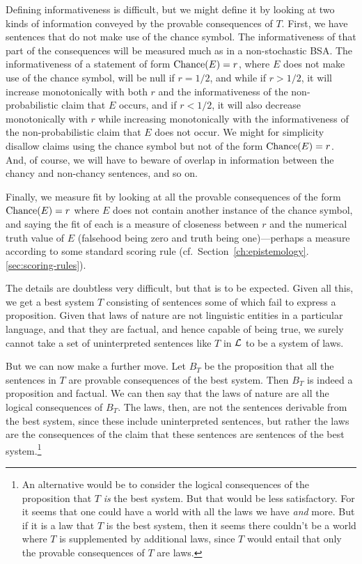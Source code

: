 Defining informativeness is difficult, but we might define it by looking at two kinds of information conveyed by the 
provable consequences of $T$. First, we have sentences that do not make use of the chance symbol. The informativeness
of that part of the consequences will be measured much as in a non-stochastic BSA. The informativeness of a statement
of form $\operatorname{Chance}(E)=r$, where $E$ does not make use of the chance symbol, will be null if $r=1/2$, and while if $r>1/2$, it will increase monotonically with both $r$ 
and the informativeness of the non-probabilistic claim that $E$ occurs, and if $r<1/2$, it will also decrease monotonically with $r$ while increasing monotonically with the informativeness of the non-probabilistic claim that $E$ does not occur. We might for
simplicity disallow claims using the chance symbol but not of the form $\operatorname{Chance}(E)=r$. And, of course, we
will have to beware of overlap in information between the chancy and non-chancy sentences, and so on. 

Finally, we measure fit by looking at all the provable consequences of the form $\operatorname{Chance}(E)=r$ where $E$ does not contain another
instance of the chance symbol, and saying the fit of each is a measure of closeness between $r$ and the numerical truth value of $E$ (falsehood
being zero and truth being one)---perhaps a measure according to some standard scoring rule (cf.\ Section~\ref{ch:epistemology}.\ref{sec:scoring-rules}).

The details are doubtless very difficult, but that is to be expected.
Given all this, we get a best system $T$ consisting of sentences some of which fail to express a proposition. Given that laws of nature
are not linguistic entities in a particular language, and that they are factual, and hence capable of being true, 
we surely cannot take  a set of uninterpreted sentences like $T$ in $\mathcal L$ to be a system of laws. 

But we can now make a further move.
Let $B_T$ be the proposition that all the sentences in $T$ are provable consequences of the best system. Then $B_T$ is indeed a proposition
and factual. We can then say that the laws of nature are all the logical consequences of $B_T$. The laws, then, are not the sentences derivable from the best system, 
since these include uninterpreted sentences, but rather the laws are the consequences of the claim that these sentences are sentences of the 
best system.\footnote{An alternative would be
to consider the logical consequences of the proposition that $T$ \textit{is} the best system. But that would be less satisfactory. For it
seems that one could have a world with all the laws we have \textit{and} more. But if it is a law that $T$ is the best system, then it seems
there couldn't be a world where $T$ is supplemented by additional laws, since $T$ would entail that only the 
provable consequences of $T$ are laws.}

